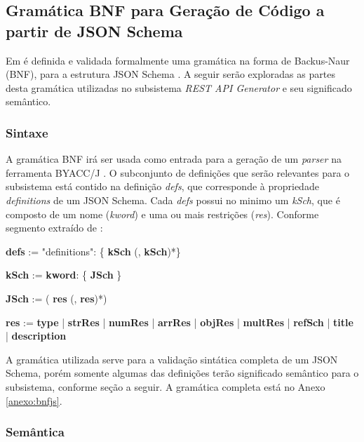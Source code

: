 
\subsection{Gramática BNF para Geração de Código a partir de JSON Schema}
\label{sec:bnf}

Em \cite{PEZOA:2016} é definida e validada formalmente uma gramática na forma de Backus-Naur (BNF), para a estrutura JSON Schema . A seguir serão exploradas as partes desta gramática utilizadas no subsistema \textit{REST API Generator} e seu significado semântico.


\subsubsection{Sintaxe}
A gramática BNF irá ser usada como entrada para a geração de um \textit{parser} na ferramenta BYACC/J \cite{BYACCJ}. O subconjunto de definições que serão relevantes para o subsistema está contido na definição \textit{defs}, que corresponde à propriedade \textit{definitions} de um JSON Schema. Cada \textit{defs} possui no minimo um \textit{kSch}, que é composto de um nome (\textit{kword}) e uma ou mais restrições (\textit{res}). Conforme segmento extraído de \cite{PEZOA:2016}:

\begin{algorithmic}
    \item \textbf{defs} := "definitions": \{ \textbf{kSch} (, \textbf{kSch})*\}
    \item \textbf{kSch} := \textbf{kword}: \{ \textbf{JSch} \}
    \item \textbf{JSch} := ( \textbf{res} (, \textbf{res})*)
    \item \textbf{res} := \textbf{type} | \textbf{strRes} | \textbf{numRes} | \textbf{arrRes} | \textbf{objRes} | \textbf{multRes} | \textbf{refSch} | \textbf{title} | \textbf{description}
\end{algorithmic}

A gramática utilizada serve para a validação sintática completa de um JSON Schema, porém somente algumas das definições terão significado semântico para o subsistema, conforme seção a seguir. A gramática completa está no Anexo \ref{anexo:bnfjs}.

\subsubsection{Semântica}

